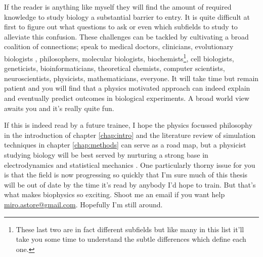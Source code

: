 If the reader is anything like myself they will find the amount of required knowledge to study biology a substantial barrier to entry. It is quite difficult at first to figure out what questions to ask or even which subfields to study to alleviate this confusion. These challenges can be tackled by cultivating a broad coalition of connections; speak to medical doctors, clinicians, evolutionary biologists \cite{dawkins1989, dawkins2016}, philosophers, molecular biologists, biochemists\footnote{These last two are in fact different subfields but like many in this list it'll take you some time to understand the subtle differences which define each one.}, cell biologists\cite{pollard2016}, geneticists, bioinformaticians, theoretical chemists, computer scientists, neuroscientists, physicists, mathematicians, everyone. It will take time but remain patient and you will find that a physics motivated approach can indeed explain and eventually predict outcomes in biological experiments. A broad world view awaits you and it's really quite fun. 

If this is indeed read by a future trainee, I hope the physics focussed philosophy in the introduction of chapter \ref{chap:intro} and the literature review of simulation techniques in chapter \ref{chap:methods} can serve as a road map, but a physicist studying biology will be best served by nurturing a strong base in electrodynamics and statistical mechanics \cite{griffiths2017, reif2009, zuckerman2010}. One particularly thorny issue for you is that the field is now progressing so quickly that I'm sure much of this thesis will be out of date by the time it's read by anybody I'd hope to train. But that's what makes biophysics so exciting. Shoot me an email if you want help \href{mailto:miro.astore@gmailcom}{miro.astore@gmail.com}. Hopefully I'm still around.

